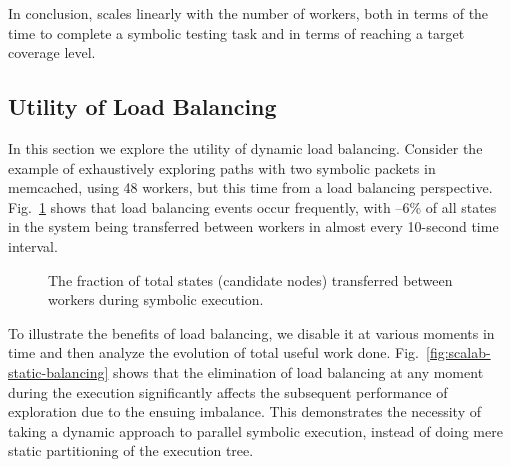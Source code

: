In conclusion, \cnine scales linearly with the number of workers, both in terms of the time to complete a symbolic testing task and in terms of reaching a target coverage level.  %

\subsection{Utility of Load Balancing}
\label{sec:profiling}
 
In this section we explore the utility of dynamic load balancing.  Consider the example of exhaustively exploring paths with two symbolic packets in memcached, using 48 workers, but this time from a load balancing perspective. Fig.~\ref{fig:scalab-load-balancing} shows that load balancing events occur frequently, with --6\% of all states in the system being transferred between workers in almost every 10-second time interval.

\begin{figure}[h!]
  \centering
  \caption{The fraction of total states (candidate nodes) transferred between workers during symbolic execution.}
  \label{fig:scalab-load-balancing}
\end{figure} 

To illustrate the benefits of load balancing, we disable it at various moments in time and then analyze the evolution of total useful work done. Fig.~\ref{fig:scalab-static-balancing} shows that the elimination of load balancing at any moment during the execution significantly affects the subsequent performance of exploration due to the ensuing imbalance.  This demonstrates the necessity of taking a dynamic approach to parallel symbolic execution, instead of doing mere static partitioning of the execution tree.



